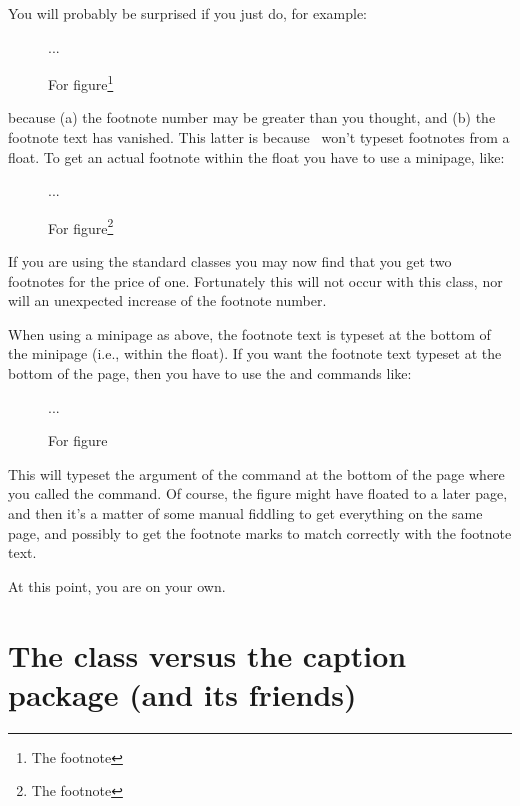    You will probably be surprised if you just do, for example:
 \begin{lcode}
 \begin{figure}
 ...
 \caption[For LoF]{For figure\footnote{The footnote}}
 \end{figure}
 \end{lcode}
because (a) the footnote number may be greater than you thought, and (b)
the footnote text has vanished. This latter is because \ltx\ won't typeset
footnotes from a float. 
To get an actual footnote within the float you have to use a minipage, 
like:
 \begin{lcode}
 \begin{figure}
 \begin{minipage}{\linewidth}
 ...
 \caption[For LoF]{For figure\footnote{The footnote}}
 \end{minipage}
 \end{figure}
 \end{lcode}
 If you are using the standard classes you may now find that you get two 
footnotes for the price of one. Fortunately this will not occur with this 
class, nor will an unexpected increase of the footnote number.

    When using a minipage as above, the footnote text is typeset at the
bottom of the minipage (i.e., within the float). 
If you want the footnote text typeset at the bottom of the page, 
then you have to use the
\cmd{\footnotemark} and \cmd{\footnotetext} commands like:
 \begin{lcode}
 \begin{figure}
 ...
 \caption[For LoF]{For figure\footnotemark}
 \end{figure}
 \end{lcode}
 This will typeset the argument of the \cmd{\footnotetext} command at the
bottom of the page where you called the command. 
Of course, the figure might have floated to a 
later page, and then it's a matter of some manual fiddling to get everything 
on the same page, and possibly to get the footnote 
marks to match correctly with the 
footnote text.

 At this point, you are on your own.


\section{The class versus the caption package (and its friends)}
\label{sec:class-versus-caption}

